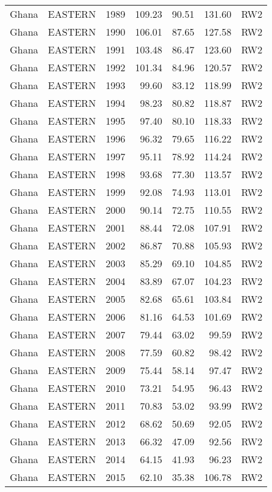 \begin{longtable}{lllrrrl}
  Ghana & EASTERN & 1989 & 109.23 & 90.51 & 131.60 & RW2 \\ 
  Ghana & EASTERN & 1990 & 106.01 & 87.65 & 127.58 & RW2 \\ 
  Ghana & EASTERN & 1991 & 103.48 & 86.47 & 123.60 & RW2 \\ 
  Ghana & EASTERN & 1992 & 101.34 & 84.96 & 120.57 & RW2 \\ 
  Ghana & EASTERN & 1993 & 99.60 & 83.12 & 118.99 & RW2 \\ 
  Ghana & EASTERN & 1994 & 98.23 & 80.82 & 118.87 & RW2 \\ 
  Ghana & EASTERN & 1995 & 97.40 & 80.10 & 118.33 & RW2 \\ 
  Ghana & EASTERN & 1996 & 96.32 & 79.65 & 116.22 & RW2 \\ 
  Ghana & EASTERN & 1997 & 95.11 & 78.92 & 114.24 & RW2 \\ 
  Ghana & EASTERN & 1998 & 93.68 & 77.30 & 113.57 & RW2 \\ 
  Ghana & EASTERN & 1999 & 92.08 & 74.93 & 113.01 & RW2 \\ 
  Ghana & EASTERN & 2000 & 90.14 & 72.75 & 110.55 & RW2 \\ 
  Ghana & EASTERN & 2001 & 88.44 & 72.08 & 107.91 & RW2 \\ 
  Ghana & EASTERN & 2002 & 86.87 & 70.88 & 105.93 & RW2 \\ 
  Ghana & EASTERN & 2003 & 85.29 & 69.10 & 104.85 & RW2 \\ 
  Ghana & EASTERN & 2004 & 83.89 & 67.07 & 104.23 & RW2 \\ 
  Ghana & EASTERN & 2005 & 82.68 & 65.61 & 103.84 & RW2 \\ 
  Ghana & EASTERN & 2006 & 81.16 & 64.53 & 101.69 & RW2 \\ 
  Ghana & EASTERN & 2007 & 79.44 & 63.02 & 99.59 & RW2 \\ 
  Ghana & EASTERN & 2008 & 77.59 & 60.82 & 98.42 & RW2 \\ 
  Ghana & EASTERN & 2009 & 75.44 & 58.14 & 97.47 & RW2 \\ 
  Ghana & EASTERN & 2010 & 73.21 & 54.95 & 96.43 & RW2 \\ 
  Ghana & EASTERN & 2011 & 70.83 & 53.02 & 93.99 & RW2 \\ 
  Ghana & EASTERN & 2012 & 68.62 & 50.69 & 92.05 & RW2 \\ 
  Ghana & EASTERN & 2013 & 66.32 & 47.09 & 92.56 & RW2 \\ 
  Ghana & EASTERN & 2014 & 64.15 & 41.93 & 96.23 & RW2 \\ 
  Ghana & EASTERN & 2015 & 62.10 & 35.38 & 106.78 & RW2 \\ 

\end{longtable}
